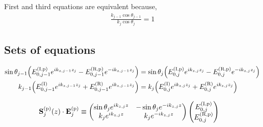 First and third equations are equivalent because,
\begin{align*}
	\frac{k_{j-1}\cos\theta_{j-1}}{k_{j}\cos\theta_{j}} = 1
\end{align*}


\subsection{Sets of equations} %
\label{sub:sets_of_equations}

\begin{align*}
	\sin\theta_{j-1}\pqty{E^{\text{(I,p)}}_{0,j-1}e^{ik_{z,j-1}z_j} - E^{\text{(R,p)}}_{0,j-1}e^{-ik_{z,j-1}z_j}} & =
	\sin\theta_{j}\pqty{E^{\text{(I,p)}}_{0,j}e^{ik_{z,j}z_j} - E^{\text{(R,p)}}_{0,j}e^{-ik_{z,j}z_j}}
	\\
	k_{j-1}\pqty{E^{\text{(I)}}_{0,j-1} e^{ik_{z,j-1}z_j} + E^{\text{(R)}}_{0,j-1} e^{ik_{z,j-1}z_j}}             & =
	k_{j}\pqty{E^{\text{(I)}}_{0,j} e^{ik_{z,j}z_j} + E^{\text{(R)}}_{0,j} e^{ik_{z,j}z_j}}
\end{align*}


\begin{align*}
	\vb{S}^{\text{(p)}}_j\pqty{z} \cdot \vb{E}^{\text{(p)}}_j
	                             & \equiv
	\pmqty{
	\sin\theta_{j} e^{ik_{z,j}z} &
	-\sin\theta_{j} e^{-ik_{z,j}z}        \\
	k_{j} e^{ik_{z,j}z}          &
	k_{j} e^{-ik_{z,j}z}
	}
	\pmqty{
	E^{\text{(I,p)}}_{0,j}                \\
		E^{\text{(R,p)}}_{0,j}
	}
\end{align*}

